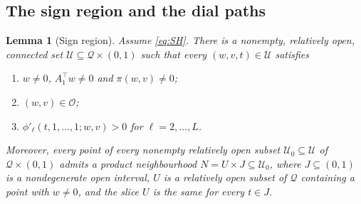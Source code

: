 \documentclass[11pt]{article}
\newtheorem{lemma}[theorem]{Lemma}
\theoremstyle{definition}
\theoremstyle{remark}
\theoremstyle{plain}
\newcommand{\cO}{\mathcal{O}}
\newcommand{\cQ}{\mathcal{Q}}
\newcommand{\cU}{\mathcal{U}}
\begin{document}
\subsection{The sign region and the dial paths}

\begin{lemma}[Sign region]\label{lem:region}
Assume \eqref{eq:SH}.  There is a nonempty, relatively open, connected set
$\cU\subseteq\cQ\times(0,1)$ such that every $(w,v,t)\in\cU$ satisfies
\begin{enumerate}
\item[(i)] $w\neq0$, $A_1^\top w\neq0$ and $\pi(w,v)\neq0$;
\item[(ii)] $(w,v)\in\cO$;
\item[(iii)] $\phi'_\ell(t,1,\dots,1;w,v)>0$ for $\ell=2,\dots,L$.
\end{enumerate}
Moreover, every point of every nonempty relatively open subset
$\cU_0\subseteq\cU$ of $\cQ\times(0,1)$ admits a \emph{product neighbourhood}
$N=U\times J\subseteq\cU_0$, where $J\subseteq(0,1)$ is a nondegenerate open interval,
$U$ is a relatively open subset of $\cQ$ containing a point with $w\neq0$, and the
slice $U$ is the same for every $t\in J$.
\end{lemma}
\end{document}
